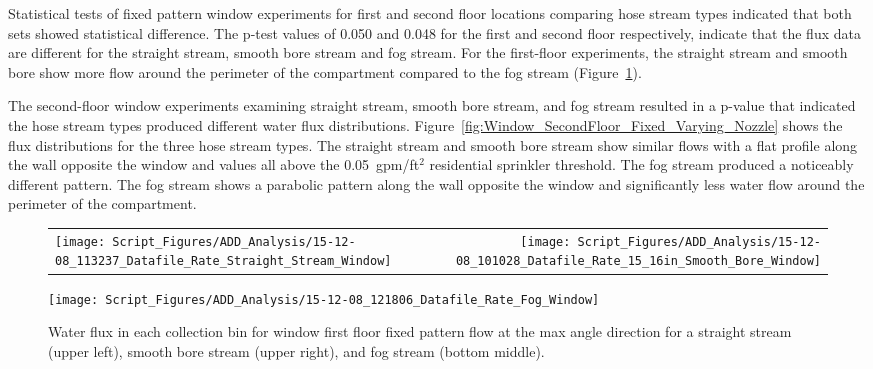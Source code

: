 \documentclass[12pt,oneside]{book}
\begin{document}
\clearpage

Statistical tests of fixed pattern window experiments for first and second floor locations comparing hose stream types indicated that both sets showed statistical difference. The p-test values of 0.050 and 0.048  for the first and second floor respectively, indicate that the flux data are different for the straight stream, smooth bore stream and fog stream. For the first-floor experiments, the straight stream and smooth bore show more flow around the perimeter of the compartment compared to the fog stream (Figure~\ref{fig:Window_FirstFloor_Fixed_Varying_Nozzle}).

The second-floor window experiments examining straight stream, smooth bore stream, and fog stream resulted in a p-value that indicated the hose stream types produced different water flux distributions. Figure~\ref{fig:Window_SecondFloor_Fixed_Varying_Nozzle} shows the flux distributions for the three hose stream types. The straight stream and smooth bore stream show similar flows with a flat profile along the wall opposite the window and values all above the 0.05~gpm/ft$^2$ residential sprinkler threshold. The fog stream produced a noticeably different pattern. The fog stream shows a parabolic pattern along the wall opposite the window and significantly less water flow around the perimeter of the compartment. 

\begin{figure}[ht]
\begin{tabular*}{\textwidth}{lr}
\texttt{[image: Script\_Figures/ADD\_Analysis/15-12-08\_113237\_Datafile\_Rate\_Straight\_Stream\_Window]} &
\texttt{[image: Script\_Figures/ADD\_Analysis/15-12-08\_101028\_Datafile\_Rate\_15\_16in\_Smooth\_Bore\_Window]} \\
\end{tabular*}
\centering
\texttt{[image: Script\_Figures/ADD\_Analysis/15-12-08\_121806\_Datafile\_Rate\_Fog\_Window]}
\caption[Water Flux for Varying Window First Floor Fixed Pattern Hose Stream Types]{Water flux in each collection bin for window first floor fixed pattern flow at the max angle direction for a straight stream (upper left), smooth bore stream (upper right), and fog stream (bottom middle).}
\label{fig:Window_FirstFloor_Fixed_Varying_Nozzle}
\end{figure}
\end{document}
